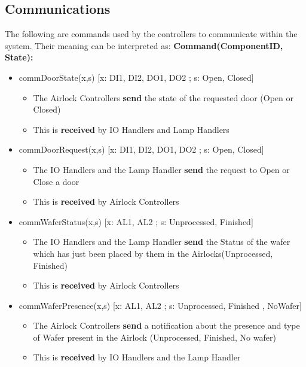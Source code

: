 \documentclass[a4paper,12pt]{article}
\begin{document}
	\subsection {Communications}
	The following are commands used by the controllers to communicate within the system. Their meaning can be interpreted as: 
	\bigskip
	\newline
	\textbf{Command(ComponentID, State):}
	\begin{itemize}
		\item commDoorState(x,s) [x: DI1, DI2, DO1, DO2 ; s: Open, Closed] 
		\begin{itemize}
			\item The Airlock Controllers \textbf{send} the state of the requested door (Open or Closed)
			\item This is \textbf{received} by IO Handlers and Lamp Handlers
		\end{itemize}
		\bigskip
		
		\item commDoorRequest(x,s) [x: DI1, DI2, DO1, DO2 ; s: Open, Closed]
		\begin{itemize}
			\item The IO Handlers and the Lamp Handler \textbf{send} the request to Open or Close a door 
			\item This is \textbf{received} by Airlock Controllers
		\end{itemize}
		\bigskip
		
		\item commWaferStatus(x,s) [x: AL1, AL2 ; s: Unprocessed, Finished]
		\begin{itemize}
			\item The IO Handlers and the Lamp Handler \textbf{send} the Status of the wafer which has just been placed by them in the Airlocks(Unprocessed, Finished) 
			\item This is \textbf{received} by Airlock Controllers
		\end{itemize}
		\bigskip
		
		\item commWaferPresence(x,s) [x: AL1, AL2 ; s: Unprocessed, Finished , NoWafer]
		\begin{itemize}
			\item The Airlock Controllers \textbf{send} a notification about the presence and type of Wafer present in the Airlock (Unprocessed, Finished, No wafer) 
			\item This is \textbf{received} by IO Handlers and the Lamp Handler
		\end{itemize}
	\end{itemize}
	\newpage
\end{document}
